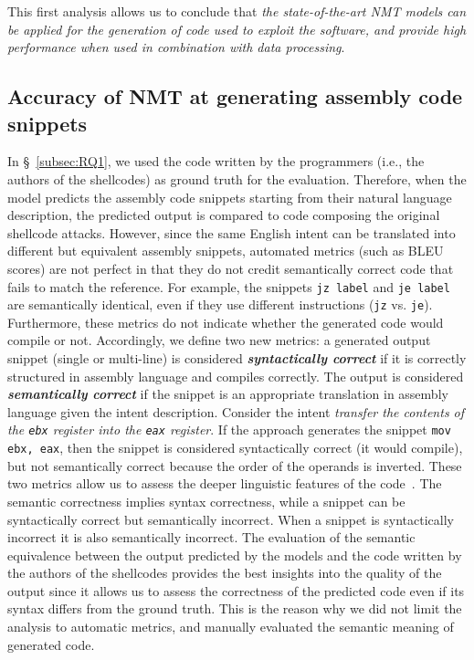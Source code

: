 This first analysis allows us to conclude that \textit{the state-of-the-art NMT models can be applied for the generation of code used to exploit the software, and provide high performance when used in combination with data processing}.



\subsection{Accuracy of NMT at generating assembly code snippets}
\label{subsec:RQ2}

In \S{}~\ref{subsec:RQ1}, we used the code written by the programmers (i.e., the authors of the shellcodes) as ground truth for the evaluation. Therefore, when the model predicts the assembly code snippets starting from their natural language description, the predicted output is compared to code composing the original shellcode attacks. 
However, since the same English intent can be translated into different but equivalent assembly snippets, automated metrics (such as BLEU scores) are not perfect in that they do not credit semantically correct code that fails to match the reference.
For example, the snippets \texttt{jz label} and \texttt{je label} are semantically identical, even if they use different instructions (\texttt{jz} vs. \texttt{je}). Furthermore, these metrics do not indicate whether the generated code would compile or not. 
Accordingly, we define two new metrics: a generated output snippet (single or multi-line) is considered \textbf{\textit{syntactically correct}} if it is correctly structured in assembly language and compiles correctly.
The output is considered \textbf{\textit{semantically correct}} if the snippet is an appropriate translation in assembly language given the intent description. 
Consider the intent \textit{transfer the contents of the \texttt{ebx} register into the \texttt{eax} register}. If the approach generates the snippet \texttt{mov ebx, eax}, then the snippet is considered syntactically correct (it would compile), but not semantically correct because the order of the operands is inverted. 
These two metrics allow us to assess the deeper linguistic features of the code~\cite{han-etal-2021-translation}. The semantic correctness implies syntax correctness, while a snippet can be syntactically correct but semantically incorrect. When a snippet is syntactically incorrect it is also semantically incorrect. The evaluation of the semantic equivalence between the output predicted by the models and the code written by the authors of the shellcodes provides the best insights into the quality of the output since it allows us to assess the correctness of the predicted code even if its syntax differs from the ground truth. This is the reason why we did not limit the analysis to automatic metrics, and manually evaluated the semantic meaning of generated code.

